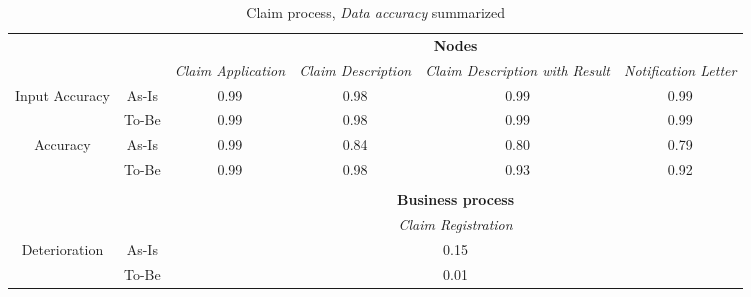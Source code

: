 \begin{center}
\begin{table}[H]
\begin{tabular}{|c|c|p{2cm}|p{2.5cm}|p{2.5cm}|p{2.5cm}|}


\cline{3-6}
\multicolumn{2}{c}{} & \multicolumn{4}{|c|}{\textbf{Nodes}} \\ \cline{3-6}
\multicolumn{2}{c|}{} & \textsl{Claim Application} & \textsl{Claim Description} & \textsl{Claim Description with Result} & \textsl{Notification Letter}\\
\hline
\multirow{2}{*}{Input Accuracy} & As-Is & \multicolumn{1}{c|}{0.99} & \multicolumn{1}{c|}{0.98} & \multicolumn{1}{c|}{0.99} & \multicolumn{1}{c|}{0.99}\\ \cline{2-6}
								& To-Be & \multicolumn{1}{c|}{0.99} & \multicolumn{1}{c|}{0.98} & \multicolumn{1}{c|}{0.99} & \multicolumn{1}{c|}{0.99}\\ \hline

\multirow{2}{*}{Accuracy} 		& As-Is & \multicolumn{1}{c|}{0.99} & \multicolumn{1}{c|}{0.84} & \multicolumn{1}{c|}{0.80} & \multicolumn{1}{c|}{0.79}\\ \cline{2-6}
								& To-Be & \multicolumn{1}{c|}{0.99} & \multicolumn{1}{c|}{0.98} & \multicolumn{1}{c|}{0.93} & \multicolumn{1}{c|}{0.92}\\ \hline

\multicolumn{6}{c}{} \\ \cline{3-6}
\multicolumn{2}{c}{} & \multicolumn{4}{|c|}{\textbf{Business process}} \\ \cline{3-6}
\multicolumn{2}{c|}{} & \multicolumn{4}{|c|}{\textsl{Claim Registration}} \\ \hline
\multirow{2}{*}{Deterioration} & As-Is & \multicolumn{4}{|c|}{0.15}\\ \cline{2-6}
							   & To-Be & \multicolumn{4}{|c|}{0.01}\\ \hline
\end{tabular}
\caption{Claim process, \textsl{Data accuracy} summarized}
\label{tab:claim_both}
\end{table}
\end{center}
